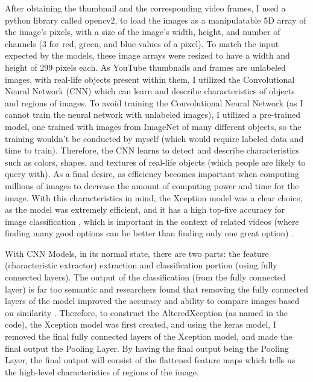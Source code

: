\documentclass[10pt,twocolumn]{article}
\begin{document}
After obtaining the thumbnail and the corresponding video frames, I used a python library called opencv2, to load the images as a manipulatable 5D array of the image's pixels, with a size of the image's width, height, and number of channels (3 for red, green, and blue values of a pixel). To match the input expected by the models, these image arrays were resized to have a width and height of 299 pixels each. As YouTube thumbnails and frames are unlabeled images, with real-life objects present within them, I utilized the Convolutional Neural Network (CNN) which can learn and describe characteristics of objects and regions of images. To avoid training the Convolutional Neural Network (as I cannot train the neural network with unlabeled images), I utilized a pre-trained model, one trained with images from ImageNet of many different objects, so the training wouldn't be conducted by myself (which would require labeled data and time to train). Therefore, the CNN learns to detect and describe characteristics such as colors, shapes, and textures of real-life objects (which people are likely to query with). As a final desire, as efficiency becomes important when computing millions of images to decrease the amount of computing power and time for the image. With this characteristics in mind, the Xception model was a clear choice, as the model was extremely efficient, and it has a high top-five accuracy for image classification \cite{Chollet2017}, which is important in the context of related videos (where finding many good options can be better than finding only one great option) \cite{Stancic2022}. 

With CNN Models, in its normal state, there are two parts: the feature (characteristic extractor) extraction and classification portion (using fully connected layers). The output of the classification (from the fully connected layer) is far too semantic and researchers found that removing the fully connected layers of the model improved the accuracy and ability to compare images based on similarity \cite{Qian2020}. Therefore, to construct the AlteredXception (as named in the code), the Xception model was first created, and using the keras model, I removed the final fully connected layers of the Xception model, and made the final output the Pooling Layer. By having the final output being the Pooling Layer, the final output will consist of the flattened feature maps which tells us the high-level characteristics of regions of the image.
\end{document}
